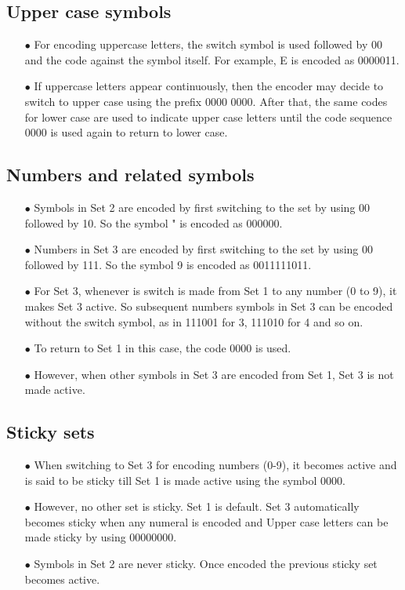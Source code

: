 \documentclass[]{article}
\begin{document}
\subsection{Upper case symbols}
\begin{itemize}
	\item[$\bullet$] For encoding uppercase letters, the switch symbol is used followed by 00 and the code against the symbol itself.  For example, E is encoded as 0000011.
	\item[$\bullet$] If uppercase letters appear continuously, then the encoder may decide to switch to upper case using the prefix 0000 0000.  After that, the same codes for lower case are used to indicate upper case letters until the code sequence 0000 is used again to return to lower case.
\end{itemize}

\subsection{Numbers and related symbols}
\begin{itemize}
	\item[$\bullet$] Symbols in Set 2 are encoded by first switching to the set by using 00 followed by 10.  So the symbol " is encoded as 000000.
	\item[$\bullet$] Numbers in Set 3 are encoded by first switching to the set by using 00 followed by 111.  So the symbol 9 is encoded as 0011111011.
	\item[$\bullet$] For Set 3, whenever is switch is made from Set 1 to any number (0 to 9), it makes Set 3 active. So subsequent numbers symbols in Set 3 can be encoded without the switch symbol, as in 111001 for 3, 111010 for 4 and so on.
	\item[$\bullet$] To return to Set 1 in this case, the code 0000 is used.
	\item[$\bullet$] However, when other symbols in Set 3 are encoded from Set 1, Set 3 is not made active.
\end{itemize}

\subsection{Sticky sets}
\begin{itemize}
	\item[$\bullet$] When switching to Set 3 for encoding numbers (0-9), it becomes active and is said to be sticky till Set 1 is made active using the symbol 0000.
	\item[$\bullet$] However, no other set is sticky. Set 1 is default. Set 3 automatically becomes sticky when any numeral is encoded and Upper case letters can be made sticky by using 00000000.
	\item[$\bullet$] Symbols in Set 2 are never sticky. Once encoded the previous sticky set becomes active.
\end{itemize}
\end{document}
